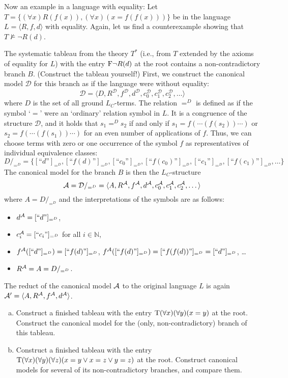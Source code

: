 \begin{example}
    Now an example in a language with equality: Let $T=\{(\forall x)R(f(x)),(\forall x)(x=f(f(x)))\}$ be in the language $L=\langle R,f,d \rangle$ with equality. Again, let us find a counterexample showing that $T\not\models\neg R(d)$. 

    The systematic tableau from the theory $T^*$ (i.e., from $T$ extended by the axioms of equality for $L$) with the entry $\mathrm{F}\neg R(d)$ at the root contains a non-contradictory branch $B$. (Construct the tableau yourself!) First, we construct the canonical model $\mathcal D$ for this branch as if the language were without equality:
    $$
    \mathcal D=\langle D,R^\mathcal D,f^\mathcal D,d^\mathcal D,c_0^\mathcal D,c_1^\mathcal D,c_2^\mathcal D,\dots\rangle
    $$
    where $D$ is the set of all ground $L_C$-terms. The relation $=^D$ is defined as if the symbol `$=$' were an `ordinary' relation symbol in $L$. It is a congruence of the structure $\mathcal D$, and it holds that $s_1=^D s_2$ if and only if $s_1=f(\cdots (f(s_2))\cdots)$ or $s_2=f(\cdots (f(s_1))\cdots)$ for an even number of applications of $f$. Thus, we can choose terms with zero or one occurrence of the symbol $f$ as representatives of individual equivalence classes:
    $$
        D/_{=^D} = \{[\text{``$d$''}]_{=^D},[\text{``$f(d)$''}]_{=^D},[\text{``$c_0$''}]_{=^D},[\text{``$f(c_0)$''}]_{=^D},[\text{``$c_1$''}]_{=^D},[\text{``$f(c_1)$''}]_{=^D},\dots\}
    $$
    The canonical model for the branch $B$ is then the $L_C$-structure 
    $$
    \mathcal{A}=\mathcal D/_{=^D}=\langle A,R^{\mathcal{A}},f^{\mathcal{A}},d^{\mathcal{A}},c_0^{\mathcal{A}},c_1^{\mathcal{A}},c_2^{\mathcal{A}},\dots\rangle
    $$
    where $A=D/_{=^D}$ and the interpretations of the symbols are as follows:
    \begin{itemize}
        \item $d^{\mathcal{A}}=[\text{``$d$''}]_{=^D}$,
        \item $c^{\mathcal{A}}_i=[\text{``$c_i$''}]_{=^D}$ for all $i\in \mathbb N$,
        \item $f^{\mathcal{A}}([\text{``$d$''}]_{=^D})=[\text{``$f(d)$''}]_{=^D}$, $f^{\mathcal{A}}([\text{``$f(d)$''}]_{=^D})=[\text{``$f(f(d))$''}]_{=^D}=[\text{``$d$''}]_{=^D}$, \dots
        \item $R^{\mathcal{A}}=A=D/_{=^D}$.
    \end{itemize}
    The reduct of the canonical model $\mathcal{A}$ to the original language $L$ is again $\mathcal{A}'=\langle A, R^{\mathcal{A}}, f^{\mathcal{A}}, d^{\mathcal{A}}\rangle$.
\end{example}

\begin{exercise}
    \begin{enumerate}[(a)]
        \item Construct a finished tableau with the entry $\mathrm{T} (\forall x)(\forall y)(x=y)$ at the root. Construct the canonical model for the (only, non-contradictory) branch of this tableau.
        \item Construct a finished tableau with the entry $\mathrm{T} (\forall x)(\forall y)(\forall z)(x=y\lor x=z \lor y=z)$ at the root. Construct canonical models for several of its non-contradictory branches, and compare them.
    \end{enumerate}
\end{exercise} 

